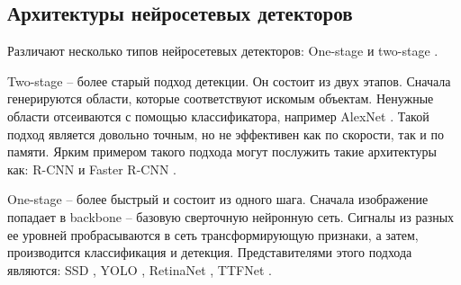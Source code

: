 \subsection{Архитектуры нейросетевых детекторов}\label{sect-4}

Различают несколько типов нейросетевых детекторов: One-stage и two-stage \cite{lib-detector-types}.

Two-stage -- более старый подход детекции. Он состоит из двух этапов. Сначала генерируются области, которые соответствуют искомым объектам. Ненужные области отсеиваются с помощью классификатора, например AlexNet \cite{lib-alexnet}. Такой подход является довольно точным, но не эффективен как по скорости, так и по памяти. Ярким примером такого подхода могут послужить такие архитектуры как: R-CNN и Faster R-CNN \cite{lib-rcnn}.

One-stage -- более быстрый и состоит из одного шага. Сначала изображение попадает в backbone -- базовую сверточную нейронную сеть. Сигналы из разных ее уровней пробрасываются в сеть трансформирующую признаки, а затем, производится классификация и детекция. Представителями этого подхода являются: SSD \cite{lib-ssd}, YOLO \cite{lib-yolo}, RetinaNet \cite{lib-retinanet}, TTFNet \cite{lib-ttfnet}.


